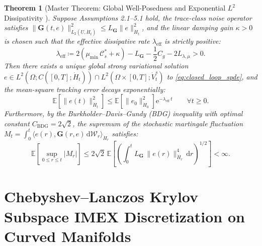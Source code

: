 \documentclass[11pt,a4paper,reqno]{article}
\newtheorem{theorem}{Theorem}[section]
\theoremstyle{definition}
\theoremstyle{remark}
\begin{document}
\begin{theorem}[Master Theorem: Global Well-Posedness and Exponential $L^2$ Dissipativity \cite{ananda2026stochastic_fluid_v2, prevot2007concise, liu2015stochastic}]\label{thm:master_stability}
Suppose Assumptions 2.1--5.1 hold, the trace-class noise operator satisfies $\|\mathbf{G}(t,e)\|_{L_2(U,\dot{H}_t)}^2 \le L_{\mathbf{G}}\|e\|_{\dot{H}_t}^2$, and the linear damping gain $\kappa > 0$ is chosen such that the effective dissipative rate $\lambda_{\mathrm{eff}}$ is strictly positive:
\begin{equation}\label{eq:lambda_eff}
  \lambda_{\mathrm{eff}} \coloneqq 2\left(\mu_{\min}\,\mathcal{C}_s^* + \kappa\right) - L_{\mathbf{G}} - \frac{1}{2}C_g - 2 L_{\lambda,\mu} > 0.
\end{equation}
Then there exists a unique global strong variational solution $e \in L^2(\Omega; C([0,T]; \dot{H}_t)) \cap L^2(\Omega \times [0,T]; \dot{V}_t^s)$ to \eqref{eq:closed_loop_spde}, and the mean-square tracking error decays exponentially:
\begin{equation}\label{eq:exp_decay_bound}
  \mathbb{E}\!\left[ \|e(t)\|_{\dot{H}_t}^2 \right] \le \mathbb{E}\!\left[ \|e_0\|_{\dot{H}_0}^2 \right] \mathrm{e}^{-\lambda_{\mathrm{eff}}\,t} \qquad \forall t \ge 0.
\end{equation}
Furthermore, by the Burkholder--Davis--Gundy (BDG) inequality \cite{burkholder1973distribution, davis1976optimal} with optimal constant $C_{\mathrm{BDG}} = 2\sqrt{2}$, the supremum of the stochastic martingale fluctuation $M_t = \int_0^t \langle e(r), \mathbf{G}(r,e)\,\mathrm{d}\mathcal{W}_r \rangle_{\dot{H}_r}$ satisfies:
\begin{equation}\label{eq:bdg_bound}
  \mathbb{E}\!\left[ \sup_{0 \le r \le t} |M_r| \right] \le 2\sqrt{2}\, \mathbb{E}\!\left[ \left( \int_0^t L_{\mathbf{G}}\,\|e(r)\|_{\dot{H}_r}^4 \,\mathrm{d}r \right)^{1/2} \right] < \infty.
\end{equation}
\end{theorem}

\section{Chebyshev--Lanczos Krylov Subspace IMEX Discretization on Curved Manifolds}
\end{document}
